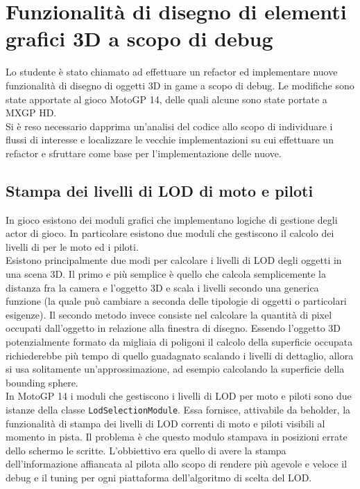 
\chapter{Funzionalità di disegno di elementi grafici 3D a scopo di debug}
\label{cap:game}

Lo studente è stato chiamato ad effettuare un refactor ed implementare nuove funzionalità di disegno di oggetti 3D in game a scopo di debug. Le modifiche sono state apportate al gioco MotoGP 14, delle quali alcune sono state portate a MXGP HD.\\

Si è reso necessario dapprima un'analisi del codice allo scopo di individuare i flussi di interesse e localizzare le vecchie implementazioni su cui effettuare un refactor e sfruttare come base per l'implementazione delle nuove.\\

\section{Stampa dei livelli di LOD di moto e piloti}

In gioco esistono dei moduli grafici che implementano logiche di gestione degli actor di gioco. In particolare esistono due moduli che gestiscono il calcolo dei livelli di  per le moto ed i piloti.\\

Esistono principalmente due modi per calcolare i livelli di LOD degli oggetti in una scena 3D. Il primo e più semplice è quello che calcola semplicemente la distanza fra la camera e l'oggetto 3D e scala i livelli secondo una generica funzione (la quale può cambiare a seconda delle tipologie di oggetti o particolari esigenze). Il secondo metodo invece consiste nel calcolare la quantità di pixel occupati dall'oggetto in relazione alla finestra di disegno. Essendo l'oggetto 3D potenzialmente formato da migliaia di poligoni il calcolo della superficie occupata richiederebbe più tempo di quello guadagnato scalando i livelli di dettaglio, allora si usa solitamente un'approssimazione, ad esempio calcolando la superficie della bounding sphere.\\

In MotoGP 14 i moduli che gestiscono i livelli di LOD per moto e piloti sono due istanze della classe \texttt{LodSelectionModule}. Essa fornisce, attivabile da beholder, la funzionalità di stampa dei livelli di LOD correnti di moto e piloti visibili al momento in pista. Il problema è che questo modulo stampava in posizioni errate dello schermo le scritte. L'obbiettivo era quello di avere la stampa dell'informazione affiancata al pilota allo scopo di rendere più agevole e veloce il debug e il tuning per ogni piattaforma dell'algoritmo di scelta del LOD.\\

